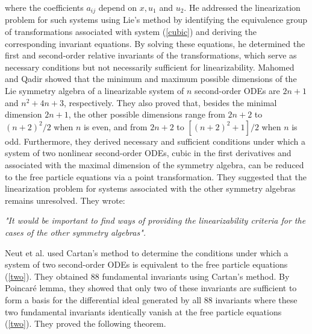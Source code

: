 \documentclass[12pt]{article}
\begin{document}
where the coefficients $a_{ij}$ depend on $x, u_{1}$ and $u_{2}$. He addressed the linearization problem for such systems using Lie’s method by identifying the equivalence group of transformations associated with system (\ref{cubic}) and deriving the corresponding invariant equations. By solving these equations, he determined the first and second-order relative invariants of the transformations, which serve as necessary conditions but not necessarily sufficient for linearizability. Mahomed and Qadir \cite{p26} showed that the minimum and maximum possible dimensions of the Lie symmetry algebra of a linearizable system of $n$ second-order ODEs are $2n+1$ and $n^{2}+4n+3$, respectively. They also proved that, besides the minimal dimension $2n+1$, the other possible dimensions range from $2n+2$ to $(n+2)^{2}/2$ when $n$ is even, and from $2n+2$ to $[(n+2)^{2}+1]/2$ when $n$ is odd. Furthermore, they derived necessary and sufficient conditions under which a system of two nonlinear second-order ODEs, cubic in the first derivatives and associated with the maximal dimension of the symmetry algebra, can be reduced to the free particle equations via a point transformation. They suggested that the linearization problem for systems associated with the other symmetry algebras remains unresolved. They wrote:
\begin{displayquote}
\textit{"It would be important to find ways of providing the linearizability criteria for the cases of the
other symmetry algebras".}
\end{displayquote}
Neut et al. \cite{R5} used Cartan’s method to determine the conditions under which a system of two second-order ODEs is equivalent to the free particle equations (\ref{two}). They obtained 88 fundamental invariants using Cartan’s method. By Poincaré lemma, they showed that only two of these invariants are sufficient to form a basis for the differential ideal generated by all 88 invariants where these two fundamental invariants identically vanish at the free particle equations (\ref{two}). They proved the following theorem.
\end{document}
